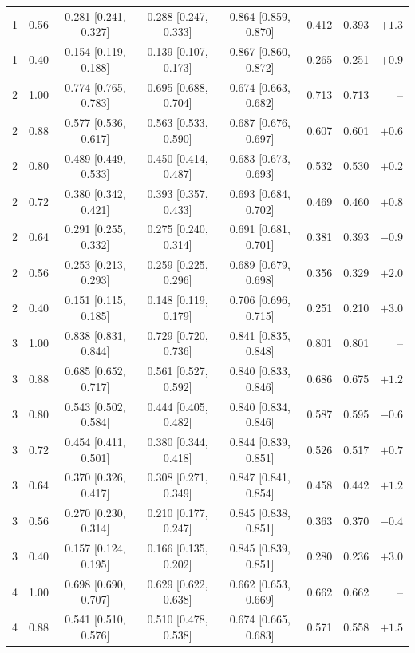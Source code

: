\begin{longtable}{cccccccr}
1 & 0.56 & 0.281 [0.241, 0.327] & 0.288 [0.247, 0.333] & 0.864 [0.859, 0.870] & 0.412 & 0.393 & $+1.3$\\
1 & 0.40 & 0.154 [0.119, 0.188] & 0.139 [0.107, 0.173] & 0.867 [0.860, 0.872] & 0.265 & 0.251 & $+0.9$\\
\midrule
2 & 1.00 & 0.774 [0.765, 0.783] & 0.695 [0.688, 0.704] & 0.674 [0.663, 0.682] & 0.713 & 0.713 & --\\
2 & 0.88 & 0.577 [0.536, 0.617] & 0.563 [0.533, 0.590] & 0.687 [0.676, 0.697] & 0.607 & 0.601 & $+0.6$\\
2 & 0.80 & 0.489 [0.449, 0.533] & 0.450 [0.414, 0.487] & 0.683 [0.673, 0.693] & 0.532 & 0.530 & $+0.2$\\
2 & 0.72 & 0.380 [0.342, 0.421] & 0.393 [0.357, 0.433] & 0.693 [0.684, 0.702] & 0.469 & 0.460 & $+0.8$\\
2 & 0.64 & 0.291 [0.255, 0.332] & 0.275 [0.240, 0.314] & 0.691 [0.681, 0.701] & 0.381 & 0.393 & $-0.9$\\
2 & 0.56 & 0.253 [0.213, 0.293] & 0.259 [0.225, 0.296] & 0.689 [0.679, 0.698] & 0.356 & 0.329 & $+2.0$\\
2 & 0.40 & 0.151 [0.115, 0.185] & 0.148 [0.119, 0.179] & 0.706 [0.696, 0.715] & 0.251 & 0.210 & $+3.0$\\
\midrule
3 & 1.00 & 0.838 [0.831, 0.844] & 0.729 [0.720, 0.736] & 0.841 [0.835, 0.848] & 0.801 & 0.801 & --\\
3 & 0.88 & 0.685 [0.652, 0.717] & 0.561 [0.527, 0.592] & 0.840 [0.833, 0.846] & 0.686 & 0.675 & $+1.2$\\
3 & 0.80 & 0.543 [0.502, 0.584] & 0.444 [0.405, 0.482] & 0.840 [0.834, 0.846] & 0.587 & 0.595 & $-0.6$\\
3 & 0.72 & 0.454 [0.411, 0.501] & 0.380 [0.344, 0.418] & 0.844 [0.839, 0.851] & 0.526 & 0.517 & $+0.7$\\
3 & 0.64 & 0.370 [0.326, 0.417] & 0.308 [0.271, 0.349] & 0.847 [0.841, 0.854] & 0.458 & 0.442 & $+1.2$\\
3 & 0.56 & 0.270 [0.230, 0.314] & 0.210 [0.177, 0.247] & 0.845 [0.838, 0.851] & 0.363 & 0.370 & $-0.4$\\
3 & 0.40 & 0.157 [0.124, 0.195] & 0.166 [0.135, 0.202] & 0.845 [0.839, 0.851] & 0.280 & 0.236 & $+3.0$\\
\midrule
4 & 1.00 & 0.698 [0.690, 0.707] & 0.629 [0.622, 0.638] & 0.662 [0.653, 0.669] & 0.662 & 0.662 & --\\
4 & 0.88 & 0.541 [0.510, 0.576] & 0.510 [0.478, 0.538] & 0.674 [0.665, 0.683] & 0.571 & 0.558 & $+1.5$\\

\end{longtable}
